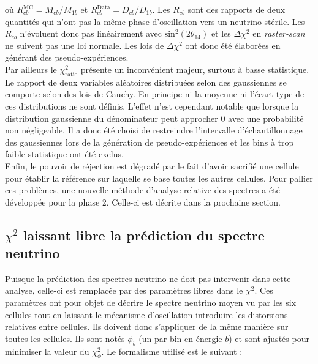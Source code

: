 \bigbreak

où $R_{cb}^\textrm{MC} = M_{cb}/M_{1b}$ et $R_{cb}^\textrm{Data} = D_{cb}/D_{1b}$. Les $R_{cb}$ sont des rapports de deux quantités qui n'ont pas la même phase d'oscillation vers un neutrino stérile. Les $R_{cb}$ n'évoluent donc pas linéairement avec $\textrm{sin}^2(2\theta_{14})$ et les $\Delta\chi^2$ en \textit{raster-scan} ne suivent pas une loi normale. Les lois de $\Delta\chi^2$ ont donc été élaborées en générant des pseudo-expériences.\\

Par ailleurs le $\chi^2_\textrm{ratio}$ présente un inconvénient majeur, surtout à basse statistique. Le rapport de deux variables aléatoires distribuées selon des gaussiennes se comporte selon des lois de Cauchy. En principe ni la moyenne ni l'écart type de ces distributions ne sont définis. L'effet n'est cependant notable que lorsque la distribution gaussienne du dénominateur peut approcher 0 avec une probabilité non négligeable. Il a donc été choisi de restreindre l'intervalle d'échantillonnage des gaussiennes lors de la génération de pseudo-expériences et les bins à trop faible statistique ont été exclus.\\

Enfin, le pouvoir de réjection est dégradé par le fait d'avoir sacrifié une cellule pour établir la référence sur laquelle se base toutes les autres cellules. Pour pallier ces problèmes, une nouvelle méthode d'analyse relative des spectres a été développée pour la phase 2. Celle-ci est décrite dans la prochaine section.

\bigbreak


\subsection{$\chi^2$ laissant libre la prédiction du spectre neutrino}
\label{sec:lediberder_chi2}

Puisque la prédiction des spectres neutrino ne doit pas intervenir dans cette analyse, celle-ci est remplacée par des paramètres libres dans le $\chi^2$. Ces paramètres ont pour objet de décrire le spectre neutrino moyen vu par les six cellules tout en laissant le mécanisme d'oscillation introduire les distorsions relatives entre cellules. Ils doivent donc s'appliquer de la même manière sur toutes les cellules. Ils sont notés $\phi_b$ (un par bin en énergie $b$) et sont ajustés pour minimiser la valeur du $\chi^2_\phi$. Le formalisme utilisé est le suivant :


